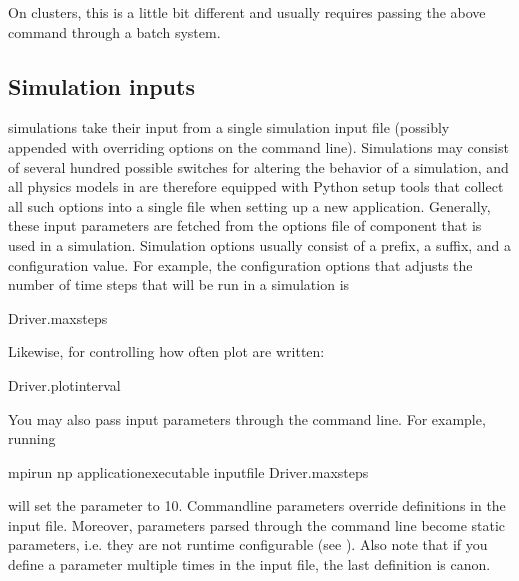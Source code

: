 \documentclass[letterpaper,10pt,english]{sphinxmanual}
\begin{document}
On clusters, this is a little bit different and usually requires passing the above command through a batch system.


\subsection{Simulation inputs}
\label{\detokenize{Base/Control:simulation-inputs}}
 simulations take their input from a single simulation input file (possibly appended with overriding options on the command line).
Simulations may consist of several hundred possible switches for altering the behavior of a simulation, and all physics models in  are therefore equipped with Python setup tools that collect all such options into a single file when setting up a new application.
Generally, these input parameters are fetched from the options file of component that is used in a simulation.
Simulation options usually consist of a prefix, a suffix, and a configuration value.
For example, the configuration options that adjusts the number of time steps that will be run in a simulation is

\begin{sphinxVerbatim}[commandchars=\\\{\},formatcom=\scriptsize]
Driver.max\PYGZus{}steps  
\end{sphinxVerbatim}

Likewise, for controlling how often plot are written:

\begin{sphinxVerbatim}[commandchars=\\\{\},formatcom=\scriptsize]
Driver.plot\PYGZus{}interval  
\end{sphinxVerbatim}

You may also pass input parameters through the command line. For example, running

\begin{sphinxVerbatim}[commandchars=\\\{\},formatcom=\scriptsize]
mpirun \PYGZhy{}np  \PYGZlt{}application\PYGZus{}executable\PYGZgt{} \PYGZlt{}input\PYGZus{}file\PYGZgt{} Driver.max\PYGZus{}steps
\end{sphinxVerbatim}

will set the  parameter to 10.
Command\sphinxhyphen{}line parameters override definitions in the input file.
Moreover, parameters parsed through the command line become static parameters, i.e. they are not run\sphinxhyphen{}time configurable (see {\hyperref[\detokenize{Base/Control:chap-runtimeconfig}]{}}).
Also note that if you define a parameter multiple times in the input file, the last definition is canon.
\end{document}
